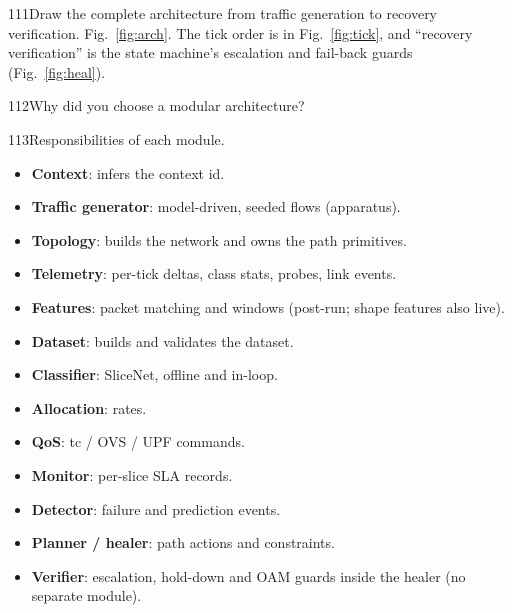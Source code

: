 \begin{qa}{111}{Draw the complete architecture from traffic generation to recovery verification.}
Fig.~\ref{fig:arch}. The tick order is in Fig.~\ref{fig:tick}, and ``recovery verification'' is the state machine's
escalation and fail-back guards (Fig.~\ref{fig:heal}).
\end{qa}

\FigTick

\begin{qa}{112}{Why did you choose a modular architecture?}
\end{qa}

\begin{qa}{113}{Responsibilities of each module.}
\begin{itemize}
\item \textbf{Context}: infers the context id.
\item \textbf{Traffic generator}: model-driven, seeded flows (apparatus).
\item \textbf{Topology}: builds the network and owns the path primitives.
\item \textbf{Telemetry}: per-tick deltas, class stats, probes, link events.
\item \textbf{Features}: packet matching and windows (post-run; shape features also live).
\item \textbf{Dataset}: builds and validates the dataset.
\item \textbf{Classifier}: SliceNet, offline and in-loop.
\item \textbf{Allocation}: rates.
\item \textbf{QoS}: tc / OVS / UPF commands.
\item \textbf{Monitor}: per-slice SLA records.
\item \textbf{Detector}: failure and prediction events.
\item \textbf{Planner / healer}: path actions and constraints.
\item \textbf{Verifier}: escalation, hold-down and OAM guards inside the healer (no separate module).
\end{itemize}
\end{qa}

